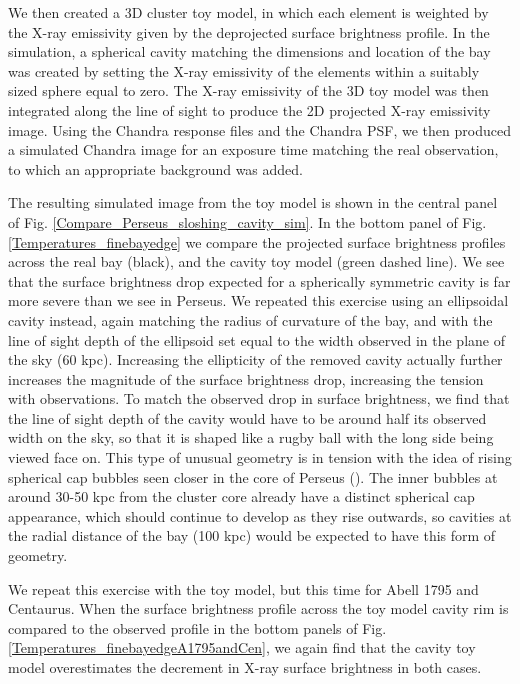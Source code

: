 \documentclass[useAMS,usenatbib]{mn2e}
\begin{document}
We then created a 3D cluster toy model, in which each element is weighted by
the X-ray emissivity given by the deprojected surface brightness profile. In the
simulation, a spherical cavity matching the dimensions and location of the bay
was created by setting the X-ray emissivity of the elements within a suitably
sized sphere equal to zero. The X-ray emissivity of the 3D toy model was then
integrated along the line of sight to produce the 2D projected X-ray emissivity
image. Using the Chandra response files and the Chandra PSF, we then produced a
simulated Chandra image for an exposure time matching the real observation, to
which an appropriate background was added. 

The resulting simulated image from the toy model is shown in the central panel of Fig.
\ref{Compare_Perseus_sloshing_cavity_sim}. In the bottom panel of Fig.
\ref{Temperatures_finebayedge} we compare the projected surface brightness
profiles across the real bay (black), and the cavity toy model (green dashed
line). We see that the surface brightness drop expected for a spherically
symmetric cavity is far more severe than we see in Perseus. We repeated this exercise using an ellipsoidal cavity instead, again
matching the radius of curvature of the bay, and with the line of sight depth of the ellipsoid set equal to the width observed in the plane of the sky (60 kpc). 
Increasing the ellipticity of the removed cavity actually further increases the magnitude of the surface brightness drop, increasing the tension
with observations. To match the observed drop in surface brightness, we find that the line of sight depth of the cavity would have to be 
around half its observed width on the sky, so that it is shaped like a rugby ball with the long side being viewed face on. This type of 
unusual geometry is in tension with the idea of rising spherical cap bubbles seen closer in the core of Perseus (\citealt{Fabian2003_filaments}). 
The inner bubbles at around 30-50 kpc from the cluster core already have a distinct spherical cap appearance, which should continue to develop as they rise outwards, 
so cavities at the radial distance of the bay (100 kpc) would be expected to have this form of geometry.

We repeat this exercise with the toy model, but this time for Abell 1795 and Centaurus. When the surface brightness profile across the toy model cavity rim
is compared to the observed profile in the bottom panels of Fig. \ref{Temperatures_finebayedgeA1795andCen}, we again find that
the cavity toy model overestimates the decrement in X-ray surface brightness in both cases.
\end{document}
